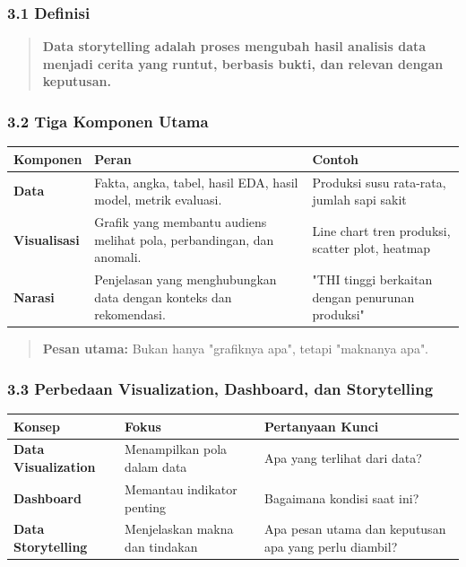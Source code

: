 \documentclass[12pt,a4paper]{article}
\begin{document}
\subsubsection{3.1 Definisi}

\begin{quote}
\textbf{Data storytelling adalah proses mengubah hasil analisis data menjadi cerita yang runtut, berbasis bukti, dan relevan dengan keputusan.}\end{quote}


\subsubsection{3.2 Tiga Komponen Utama}

\begin{tabular}{|l|l|l|}
\hline
Komponen & Peran & Contoh \\
\hline
\textbf{Data} & Fakta, angka, tabel, hasil EDA, hasil model, metrik evaluasi. & Produksi susu rata-rata, jumlah sapi sakit \\
\hline
\textbf{Visualisasi} & Grafik yang membantu audiens melihat pola, perbandingan, dan anomali. & Line chart tren produksi, scatter plot, heatmap \\
\hline
\textbf{Narasi} & Penjelasan yang menghubungkan data dengan konteks dan rekomendasi. & "THI tinggi berkaitan dengan penurunan produksi" \\
\hline
\end{tabular}


\begin{quote}
\textbf{Pesan utama:} Bukan hanya "grafiknya apa", tetapi "maknanya apa".\end{quote}


\subsubsection{3.3 Perbedaan Visualization, Dashboard, dan Storytelling}

\begin{tabular}{|l|l|l|}
\hline
Konsep & Fokus & Pertanyaan Kunci \\
\hline
\textbf{Data Visualization} & Menampilkan pola dalam data & Apa yang terlihat dari data? \\
\hline
\textbf{Dashboard} & Memantau indikator penting & Bagaimana kondisi saat ini? \\
\hline
\textbf{Data Storytelling} & Menjelaskan makna dan tindakan & Apa pesan utama dan keputusan apa yang perlu diambil? \\
\hline
\end{tabular}
\end{document}
